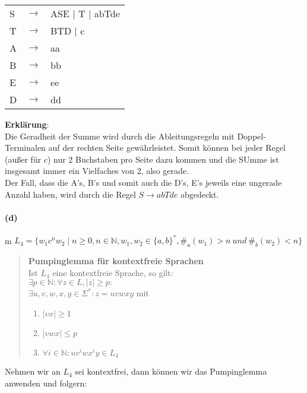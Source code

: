 	\begin{tabular}{lcl}
		S  & $\rightarrow$ & ASE $\mid$ T $\mid$ abTde \\
		T  & $\rightarrow$ & BTD $\mid$ c \\
		A & $\rightarrow$ & aa \\
		B & $\rightarrow$ & bb \\
		E  & $\rightarrow$ & ee \\
		D  & $\rightarrow$ & dd \\
	\end{tabular}
	
	\textbf{Erklärung}: \\
	Die Geradheit der Summe wird durch die Ableitungsregeln mit Doppel-Terminalen auf der rechten Seite gewährleistet. Somit können bei jeder Regel (außer für $c$) nur 2 Buchstaben pro Seite dazu kommen und die SUmme ist insgesamt immer ein Vielfaches von 2, also gerade.\\
	Der Fall, dass die A's, B's und somit auch die D's, E's jeweils eine ungerade Anzahl haben, wird durch die Regel $S \rightarrow abTde$ abgedeckt.
	\vspace{0.3cm}
	
\paragraph{(d)}m
	$L_4 = \{w_1c^nw_2 \mid n \geq 0, n \in \mathbb{N}, w_1,w_2 \in \{a,b\}^*, \#_a(w_1)>n\ und\ \#_b(w_2)<n\}$	

	\begin{quote}
	\textbf{Pumpinglemma für kontextfreie Sprachen} \\
	Ist $L_4$ eine kontextfreie Sprache, so gilt: \\
	$\exists p \in \mathbb{N}: \forall z \in L, |z| \geq p:$ \\
	$\exists u,v,w,x,y \in \Sigma^*: z = uvwxy$ mit
	\begin{enumerate}
		\item $|vx| \geq 1$
		\item $|vwx| \leq p$
		\item $\forall i \in \mathbb{N} : uv^{i}wx^{i}y \in L_4$
	\end{enumerate}
	\end{quote}

	Nehmen wir an $L_4$ sei kontextfrei, dann können wir das Pumpinglemma anwenden und folgern:
	
